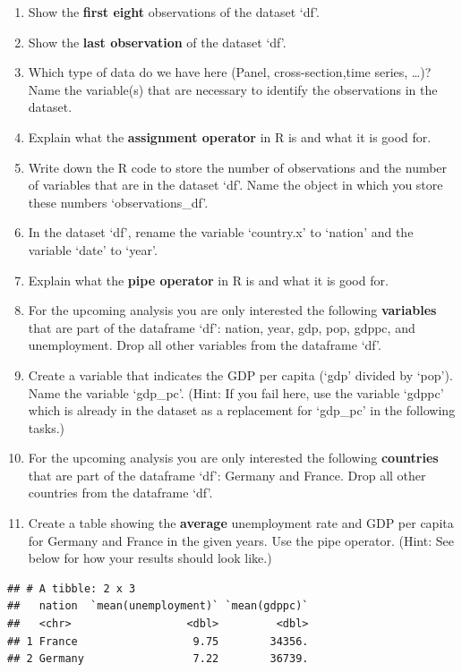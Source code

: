 \documentclass[
  12pt,
  oneside]{book}
\begin{document}
\begin{enumerate}
\def\labelenumi{(\arabic{enumi})}
\setcounter{enumi}{4}
\item
  Show the \textbf{first eight} observations of the dataset `df'.
\item
  Show the \textbf{last observation} of the dataset `df'.
\item
  Which type of data do we have here (Panel, cross-section,time series, \ldots)?
  Name the variable(s) that are necessary to identify the observations in the dataset.
\item
  Explain what the \textbf{assignment operator} in R is and what it is good for.
\item
  Write down the R code to store the number of observations and the number of variables
  that are in the dataset `df'. Name the object in which you store these numbers `observations\_df'.
\item
  In the dataset `df', rename the variable `country.x' to `nation' and the
  variable `date' to `year'.
\item
  Explain what the \textbf{pipe operator} in R is and what it is good for.
\item
  For the upcoming analysis you are only interested the following \textbf{variables}
  that are part of the dataframe `df': nation, year, gdp, pop, gdppc,
  and unemployment. Drop all other variables from the dataframe `df'.
\item
  Create a variable that indicates the GDP per capita (`gdp' divided by `pop').
  Name the variable `gdp\_pc'. (Hint: If you fail here, use the variable `gdppc' which is
  already in the dataset as a replacement for `gdp\_pc' in the following tasks.)
\item
  For the upcoming analysis you are only interested the following \textbf{countries}
  that are part of the dataframe `df': Germany and France. Drop all other
  countries from the dataframe `df'.
\item
  Create a table showing the \textbf{average} unemployment rate and GDP per capita for Germany
  and France in the given years. Use the pipe operator. (Hint: See below for how your results should
  look like.)
\end{enumerate}

\begin{verbatim}
## # A tibble: 2 x 3
##   nation  `mean(unemployment)` `mean(gdppc)`
##   <chr>                  <dbl>         <dbl>
## 1 France                  9.75        34356.
## 2 Germany                 7.22        36739.
\end{verbatim}
\end{document}
